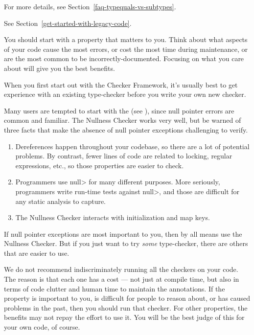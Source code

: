 For more details, see Section~\ref{faq-typequals-vs-subtypes}.





See Section~\ref{get-started-with-legacy-code}.



You should start with a property that matters to you.  Think about what
aspects of your code cause the most errors, or cost the most time during
maintenance, or are the most common to be incorrectly-documented.  Focusing
on what you care about will give you the best benefits.

When you first start out with the Checker Framework, it's usually best to
get experience with an existing type-checker before you write your own new
checker.

Many users are tempted to start with the
 (see
), since null pointer errors are common
and familiar.  The Nullness Checker works very well, but be warned of three
facts that make the absence of null pointer exceptions challenging to
verify.

\begin{enumerate}
\item
  Dereferences happen throughout your codebase, so there are a lot of
  potential problems.  By contrast, fewer lines of code are related to
  locking, regular expressions, etc., so those properties are easier to
  check.
\item
  Programmers use \<null> for many different purposes.  More seriously,
  programmers write run-time tests against \<null>, and those are difficult
  for any static analysis to capture.
\item
  The Nullness Checker interacts with initialization and map keys.
\end{enumerate}

If null pointer exceptions are most important to you, then by all means use
the Nullness Checker.  But if you just want to try \emph{some}
type-checker, there are others that are easier to use.

We do not recommend indiscriminately running all the checkers on your code.
The reason is that each one has a cost --- not just at compile time, but
also in terms of code clutter and human time to maintain the annotations.
If the property is important to you, is difficult for people to reason
about, or has caused problems in the past, then you should run that
checker.  For other properties, the benefits may not repay the effort to
use it.  You will be the best judge of this for your own code, of course.

